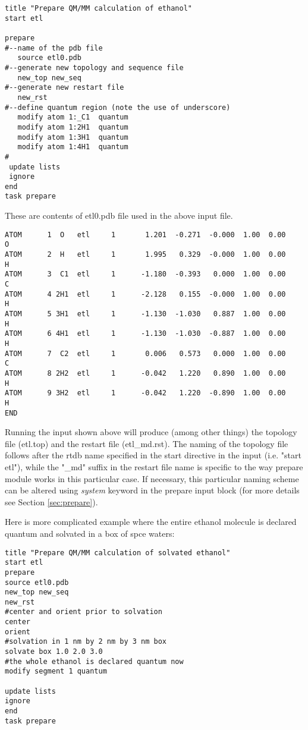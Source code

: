 \begin{verbatim}
title "Prepare QM/MM calculation of ethanol"
start etl

prepare
#--name of the pdb file
   source etl0.pdb                    
#--generate new topology and sequence file
   new_top new_seq                    
#--generate new restart file
   new_rst                            
#--define quantum region (note the use of underscore)
   modify atom 1:_C1  quantum         
   modify atom 1:2H1  quantum         
   modify atom 1:3H1  quantum         
   modify atom 1:4H1  quantum         
#
 update lists
 ignore
end
task prepare
\end{verbatim}

These are contents of etl0.pdb file used in the above input file.
\begin{verbatim}
ATOM      1  O   etl     1       1.201  -0.271  -0.000  1.00  0.00           O
ATOM      2  H   etl     1       1.995   0.329  -0.000  1.00  0.00           H
ATOM      3  C1  etl     1      -1.180  -0.393   0.000  1.00  0.00           C
ATOM      4 2H1  etl     1      -2.128   0.155  -0.000  1.00  0.00           H
ATOM      5 3H1  etl     1      -1.130  -1.030   0.887  1.00  0.00           H
ATOM      6 4H1  etl     1      -1.130  -1.030  -0.887  1.00  0.00           H
ATOM      7  C2  etl     1       0.006   0.573   0.000  1.00  0.00           C
ATOM      8 2H2  etl     1      -0.042   1.220   0.890  1.00  0.00           H
ATOM      9 3H2  etl     1      -0.042   1.220  -0.890  1.00  0.00           H
END
\end{verbatim}

Running the input shown above will produce (among other things) the topology file (etl.top) and the restart file
(etl{\_}md.rst). The naming of the topology file follows after the rtdb name specified in the start directive in the input (i.e. "start etl"),
while the "{\_}md" suffix in the restart file name is specific to the way prepare module works in this particular case. If necessary, this
particular naming scheme can be altered using {\it system} keyword 
in the prepare input block (for more details see Section \ref{sec:prepare}).

Here is more complicated example where the entire ethanol molecule
is declared quantum and solvated in a box of spce waters:
\begin{verbatim}
title "Prepare QM/MM calculation of solvated ethanol"
start etl
prepare
source etl0.pdb
new_top new_seq
new_rst
#center and orient prior to solvation
center
orient
#solvation in 1 nm by 2 nm by 3 nm box
solvate box 1.0 2.0 3.0
#the whole ethanol is declared quantum now
modify segment 1 quantum

update lists
ignore
end
task prepare

\end{verbatim}

